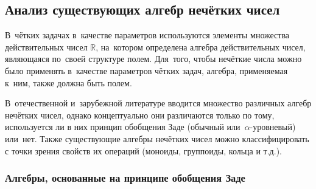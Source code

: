 \subsection{Анализ существующих алгебр нечётких чисел}

В~чётких задачах в~качестве параметров используются элементы множества действительных чисел $\mathbb{R}$, на~котором определена алгебра действительных чисел, являющаяся по~своей структуре полем. Для~того, чтобы нечёткие числа можно было применять в~качестве параметров чётких задач, алгебра, применяемая к~ним, также должна быть полем.

В~отечественной и~зарубежной литературе вводится множество различных алгебр нечётких чисел, однако концептуально они различаются только по тому, используется ли в них принцип обобщения Заде (обычный или~$\alpha$-уровневый) или~нет. Также существующие алгебры нечётких чисел можно классифицировать с точки зрения свойств их операций (моноиды, группоиды, кольца и т.д.).

\subsubsection*{Алгебры, основанные на принципе обобщения Заде}

